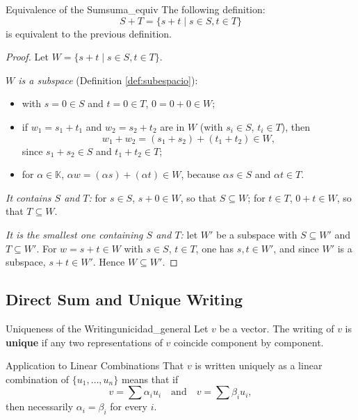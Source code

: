 \documentclass[11pt, a4paper]{article}
\begin{document}
\begin{proposicion}{Equivalence of the Sum}{suma_equiv}
The following definition:
\[
S+T = \{ s+t \mid s \in S, t \in T \}
\]
is equivalent to the previous definition.
\end{proposicion}

\begin{proof}
Let $W = \{ s+t \mid s \in S, t \in T \}$.

\textit{$W$ is a subspace} (Definition \ref{def:subespacio}):
\begin{itemize}
    \item with $s=0 \in S$ and $t=0 \in T$, $0 = 0+0 \in W$;
    \item if $w_1 = s_1+t_1$ and $w_2 = s_2+t_2$ are in $W$ (with $s_i \in S$, $t_i \in T$), then
    \[
    w_1 + w_2 = (s_1+s_2) + (t_1+t_2) \in W,
    \]
    since $s_1+s_2 \in S$ and $t_1+t_2 \in T$;
    \item for $\alpha \in \mathbb{K}$, $\alpha w = (\alpha s) + (\alpha t) \in W$, because $\alpha s \in S$ and $\alpha t \in T$.
\end{itemize}

\textit{It contains $S$ and $T$:} for $s \in S$, $s+0 \in W$, so that $S \subseteq W$; for $t \in T$, $0+t \in W$, so that $T \subseteq W$.

\textit{It is the smallest one containing $S$ and $T$:} let $W'$ be a subspace with $S \subseteq W'$ and $T \subseteq W'$. For $w = s+t \in W$ with $s \in S$, $t \in T$, one has $s, t \in W'$, and since $W'$ is a subspace, $s+t \in W'$. Hence $W \subseteq W'$.
\end{proof}

\subsection{Direct Sum and Unique Writing}

\begin{definicion}{Uniqueness of the Writing}{unicidad_general}
Let $v$ be a vector. The writing of $v$ is \textbf{unique} if any two representations of $v$ coincide component by component.
\end{definicion}

\begin{ejemplo}{Application to Linear Combinations}{}
That $v$ is written uniquely as a linear combination of $\{u_1, \dots, u_n\}$ means that if
\[
v = \sum \alpha_i u_i \quad \text{and} \quad v = \sum \beta_i u_i,
\]
then necessarily $\alpha_i = \beta_i$ for every $i$.
\end{ejemplo}
\end{document}
